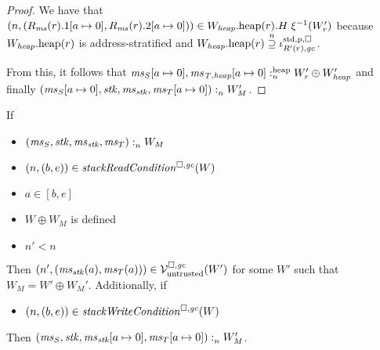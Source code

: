 \documentclass[a4paper]{article}
\begin{document}
\begin{proof}
  We have that $\npair{(R_\ms(r).1\update{a}{0},R_\ms(r).2\update{a}{0})} \in \pwheap[W_\var{heap}](r).H \; \xi^{-1}(W_r')$ because $\pwheap[W_\var{heap}](r)$ is address-stratified and $\pwheap[W_\var{heap}](r) \nsupeq \stdreg{R'(r),\gc}{\pur}$.

  From this, it follows that $\memSatHeap{\ms_S\update{a}{0},\ms_\var{T,heap}\update{a}{0}}{W_r' \oplus W_\var{heap}'}$ and finally $\memSat{(\ms_S\update{a}{0},\stk,\ms_\stk,\ms_T\update{a}{0})}{W_M'}$.
\end{proof}

\begin{lemma}
  \label{lem:stackreadcond-stackwritecond-work}
  If
  \begin{itemize}
  \item $\memSat{(\ms_S,\stk,\ms_\stk,\ms_T)}{W_M}$
  \item $\npair{(b,e)}\in\stackReadCond{W}$
  \item $a \in [b,e]$
  \item $W \oplus W_M$ is defined
  \item $n' < n$
  \end{itemize}
  Then $\npair[n']{(\ms_\stk(a),\ms_T(a))} \in \lrv(W')$ for some $W'$ such that $W_M = W' \oplus W_M'$.
  Additionally, if
  \begin{itemize}
  \item $\npair{(b,e)}\in\stackWriteCond{W}$
  \end{itemize}
  Then $\memSat{(\ms_S,\stk,\ms_\stk[a\mapsto 0],\ms_T[a\mapsto 0])}{W_M'}$.
\end{lemma}
\end{document}
